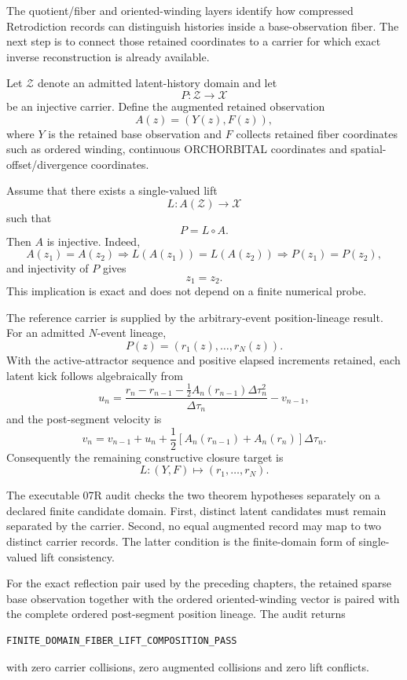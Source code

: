 \documentclass[11pt]{book}
\begin{document}
The quotient/fiber and oriented-winding layers identify how compressed Retrodiction records can distinguish histories inside a base-observation fiber.  The next step is to connect those retained coordinates to a carrier for which exact inverse reconstruction is already available.

Let \(\mathcal Z\) denote an admitted latent-history domain and let
\[
P:\mathcal Z\to\mathcal X
\]
be an injective carrier.  Define the augmented retained observation
\[
\boxed{A(z)=(Y(z),F(z)),}
\]
where \(Y\) is the retained base observation and \(F\) collects retained fiber coordinates such as ordered winding, continuous ORCHORBITAL coordinates and spatial-offset/divergence coordinates.

Assume that there exists a single-valued lift
\[
L:A(\mathcal Z)\to\mathcal X
\]
such that
\[
\boxed{P=L\circ A.}
\]
Then \(A\) is injective.  Indeed,
\[
A(z_1)=A(z_2)
\Longrightarrow
L(A(z_1))=L(A(z_2))
\Longrightarrow
P(z_1)=P(z_2),
\]
and injectivity of \(P\) gives
\[
\boxed{z_1=z_2.}
\]
This implication is exact and does not depend on a finite numerical probe.

The reference carrier is supplied by the arbitrary-event position-lineage result.  For an admitted \(N\)-event lineage,
\[
\boxed{P(z)=(r_1(z),\ldots,r_N(z)).}
\]
With the active-attractor sequence and positive elapsed increments retained, each latent kick follows algebraically from
\[
\boxed{
u_n=
\frac{r_n-r_{n-1}-\frac12A_n(r_{n-1})\Delta\tau_n^2}
{\Delta\tau_n}
-v_{n-1},}
\]
and the post-segment velocity is
\[
\boxed{
v_n=v_{n-1}+u_n+
\frac12\left[A_n(r_{n-1})+A_n(r_n)\right]\Delta\tau_n.}
\]
Consequently the remaining constructive closure target is
\[
\boxed{
L:(Y,F)\mapsto(r_1,\ldots,r_N).
}
\]

The executable 07R audit checks the two theorem hypotheses separately on a declared finite candidate domain.  First, distinct latent candidates must remain separated by the carrier.  Second, no equal augmented record may map to two distinct carrier records.  The latter condition is the finite-domain form of single-valued lift consistency.

For the exact reflection pair used by the preceding chapters, the retained sparse base observation together with the ordered oriented-winding vector is paired with the complete ordered post-segment position lineage.  The audit returns
\begin{verbatim}
FINITE_DOMAIN_FIBER_LIFT_COMPOSITION_PASS
\end{verbatim}
with zero carrier collisions, zero augmented collisions and zero lift conflicts.
\end{document}
